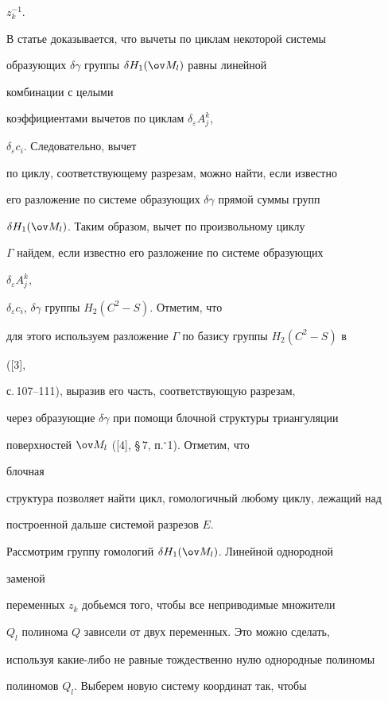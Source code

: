 $z^{-1}_k$. 


 


В статье доказывается, что вычеты по циклам некоторой системы 


образующих $\delta\gamma$ группы $\delta H_1(\ov M_l)$ равны линейной 


комбинации с целыми 


коэффициентами вычетов по циклам $\delta_\varepsilon A^k_j$, 


$\delta_\varepsilon c_i$. Следовательно, вычет 


по циклу, соответствующему разрезам, можно найти, если известно 


его разложение по системе образующих $\delta\gamma$ прямой суммы групп  


$\delta H_1(\ov M_l)$. Таким образом, вычет по произвольному циклу 


$\Gamma$ найдем, если известно его разложение по системе образующих 


$\delta_\varepsilon A^k_j$, 


$\delta_\varepsilon c_i$, $\delta\gamma$ группы $H_2(C^2-S)$. Отметим, что 


для этого используем разложение $\Gamma$ по базису группы $H_2(C^2-S)$ в 


([3], 


с.\,107--111), выразив его часть, соответствующую разрезам, 


через образующие $\delta\gamma$ при помощи блочной структуры триангуляции 


поверхностей $\ov M_l$ ([4], \S\,7, п.${}^\circ$1). Отметим, что 


блочная 


структура позволяет найти цикл, гомологичный любому циклу, лежащий над  


построенной дальше системой разрезов $E$. 


 


Рассмотрим группу гомологий $\delta H_1(\ov M_l)$. Линейной однородной 


заменой 


переменных $z_k$ добьемся того, чтобы все неприводимые множители 


$Q_l$ полинома $Q$ зависели от двух переменных. Это можно сделать,  


используя какие-либо не равные тождественно нулю однородные полиномы 


полиномов $Q_l$. Выберем новую систему координат так, чтобы  


